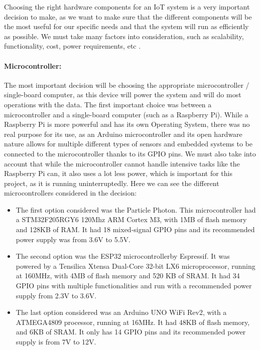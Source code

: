 \documentclass[12pt]{article}
\begin{document}
Choosing the right hardware components for an IoT system is a very important decision to make, as we want to make sure that the different components will be the most useful for our specific needs and that the system will run as efficiently as possible. We must take many factors into consideration, such as scalability, functionality, cost, power requirements, etc \cite{digiteum}.\par

\paragraph*{Microcontroller:}
The most important decision will be choosing the appropriate microcontroller / single-board computer, as this device will power the system and will do most operations with the data. The first important choice was between a microcontroller and a single-board computer (such as a Raspberry Pi). While a Raspberry Pi is more powerful and has its own Operating System, there was no real purpose for its use, as an Arduino microcontroller and its open hardware nature allows for multiple different types of sensors and embedded systems to be connected to the microcontroller thanks to its GPIO pins. We must also take into account that while the microcontroller cannot handle intensive tasks like the Raspberry Pi can, it also uses a lot less power, which is important for this project, as it is running uninterruptedly. Here we can see the different microcontrollers considered in the decision:

\begin{itemize}
    \item The first option considered was the Particle Photon. This microcontroller had a STM32F205RGY6 120Mhz ARM Cortex M3, with 1MB of flash memory and 128KB of RAM. It had 18 mixed-signal GPIO pins and its recommended power supply was from 3.6V to 5.5V.
    \item The second option was the ESP32 microcontrollerby Espressif. It was powered by a Tensilica Xtensa Dual-Core 32-bit LX6 microprocessor, running at 160MHz, with 4MB of flash memory and 520 KB of SRAM. It had 34 GPIO pins with multiple functionalities and run with a recommended power supply from 2.3V to 3.6V.
    \item The last option considered was an Arduino UNO WiFi Rev2, with a ATMEGA4809 processor, running at 16MHz. It had 48KB of flash memory, and 6KB of SRAM. It only has 14 GPIO pins and its recommended power supply is from 7V to 12V. 
\end{itemize}
\end{document}
